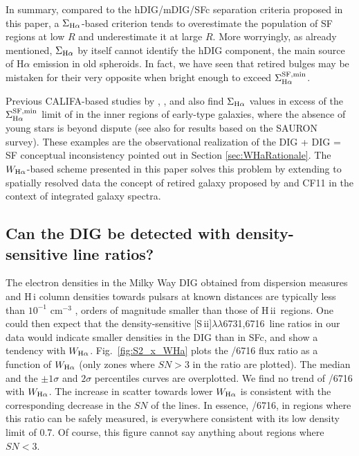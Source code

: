 \documentclass[a4paper, fleqn, usenatbib, useAMS]{mnras}
\newcommand{\Ha}{\ifmmode {\rm H}\alpha \else H$\alpha$\fi\xspace}
\newcommand{\hi}{H\,{\sc i}\xspace}
\newcommand{\hii}{H\,{\sc ii}\xspace}
\newcommand{\Sii}{[S\,{\sc ii}]$\lambda\lambda$6731,6716}
\newcommand{\sii}{\ifmmode [\rm{S}\,\textsc{ii}] \else [S\,{\sc ii}]\fi\xspace}
\begin{document}
In summary, compared to the hDIG/mDIG/SFc separation criteria proposed in this paper, a $\Sigma_{\Ha}$-based criterion tends to overestimate the population of SF regions at low $R$ and underestimate it at large $R$.  More worryingly, as already mentioned,   $\Sigma_{\Ha}$ by itself cannot identify the hDIG component, the main source of \Ha emission in old spheroids. In fact, we have seen that retired bulges may be mistaken for their very opposite when bright enough to exceed $\Sigma^{\rm SF,min}_{\Ha}$.

Previous CALIFA-based studies by \citet{Kehrig.etal.2012}, \citet{Singh.etal.2013}, and \citet{Gomes.etal.2016b} also find $\Sigma_{\Ha}$ values in excess of the $\Sigma^{\rm SF,min}_{\Ha}$ limit of \citet{Zhang.etal.2017a} in the inner regions of early-type galaxies, where the absence of young stars is beyond dispute (see also \citealt{Sarzi.etal.2010} for results based on the SAURON survey). These examples are the observational realization of the DIG + DIG = SF conceptual inconsistency pointed out in Section \ref{sec:WHaRationale}. The $W_{\Ha}$-based scheme presented in this paper solves this problem by extending to spatially resolved data the concept of retired galaxy proposed by \citet{Stasinska.etal.2008a} and CF11 in the context of integrated galaxy spectra.


\subsection{Can the DIG be detected with density-sensitive line ratios?}
\label{sec:nSii}

The electron densities in the Milky Way DIG obtained from dispersion measures and \hi column densities towards pulsars at known distances are typically less than $10^{-1}$ cm$^{-3}$ \citep{Berk.and.Fletcher.2008},  orders of magnitude smaller than those of \hii\ regions. One could then expect that the density-sensitive \Sii\ line ratios in our data would indicate smaller densities in the DIG than in  SFc, and show a tendency with $W_{\Ha}$. Fig.\ \ref{fig:S2_x_WHa} plots the \sii 6731/6716 flux ratio as a function of $W_{\Ha}$ (only zones where $SN > 3$ in the \sii ratio are plotted). The median and the $\pm 1\sigma$ and $2\sigma$ percentiles curves are overplotted. We find no trend of  \sii 6731/6716 with $W_{\Ha}$. The increase in scatter towards lower $W_{\Ha}$ is consistent with the corresponding decrease in the $SN$ of the lines. In essence, \sii 6731/6716, in regions where this ratio can be safely measured, is everywhere consistent with its low density limit of 0.7. Of course, this figure cannot say anything about regions where $SN < 3$.
\end{document}

